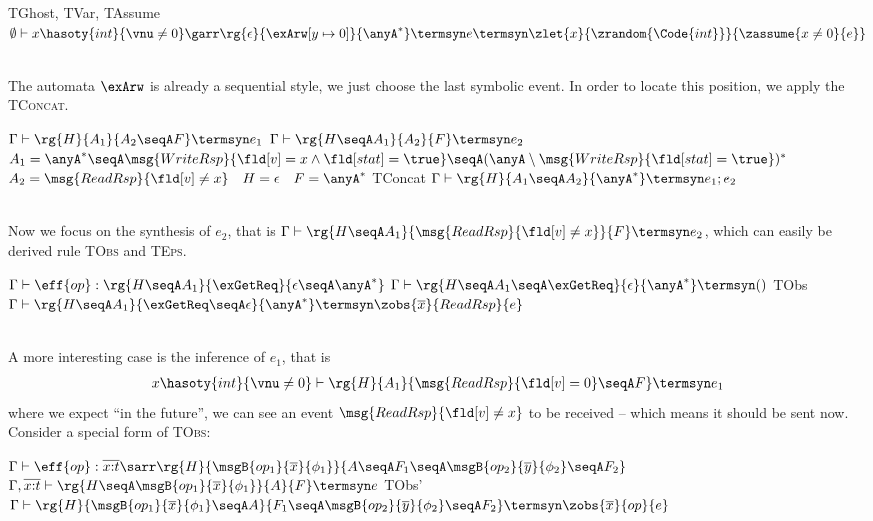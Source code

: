 {\footnotesize{}
{TGhost, TVar, TAssume}
{$\emptyset \vdash x\hasoty{int}{\vnu \not= 0}\garr \rg{\epsilon}{\exArw[y \mapsto 0]}{\anyA^*} \termsyn e \termsyn \zlet{x}{\zrandom{\Code{int}}}{\zassume{x \not= 0}{e}}$}}
\\ \ 

The automata $\exArw$ is already a sequential style, we just choose the last symbolic event. In order to locate this position, we apply the \textsc{TConcat}.

{\footnotesize\mprooftr{100mm}
{$\Gamma \vdash \rg{H}{A_1}{A_2 \seqA F} \termsyn e_1$ \quad
 $\Gamma \vdash \rg{H\seqA A_1}{A_2}{F} \termsyn e_2$ \quad
 $A_1 = \anyA^* \seqA \msg{WriteRsp}{\fld[v] = x \land \fld[stat] = \true} \seqA (\anyA \setminus \msg{WriteRsp}{\fld[stat] = \true})^*$\quad
 $A_2 = \msg{ReadRsp}{\fld[v] \not= x} \quad H = \epsilon \quad  F = \anyA^*$
 }
{TConcat}
{$\Gamma \vdash \rg{H}{A_1 \seqA A_2}{\anyA^*} \termsyn e_1;e_2$}}
\\ \ 

Now we focus on the synthesis of $e_2$, that is $\Gamma \vdash \rg{H\seqA A_1}{\msg{ReadRsp}{\fld[v] \not= x}}{F} \termsyn e_2$, which can easily be derived rule \textsc{TObs} and \textsc{TEps}.

{\footnotesize\mprooftr{105mm}
{
$\Gamma \vdash \eff{op} : \rg{ H\seqA A_1 }{\exGetReq}{\epsilon \seqA \anyA^*}$ 
\quad
 $\Gamma \vdash \rg{H\seqA A_1 \seqA \exGetReq}{\epsilon}{\anyA^*} \termsyn ()$}
{TObs}
{$\Gamma \vdash \rg{H\seqA A_1}{\exGetReq \seqA \epsilon}{\anyA^*} \termsyn \zobs{\overline{x}}{ReadRsp}{e}$}}
\\ \ 

A more interesting case is the inference of $e_1$, that is 
\begin{align*}
   x\hasoty{int}{\vnu \not= 0} \vdash \rg{H}{A_1}{\msg{ReadRsp}{\fld[v] = 0} \seqA F} \termsyn e_1
\end{align*}\noindent
where we expect ``in the future'', we can see an event $\msg{ReadRsp}{\fld[v] \not= x}$ to be received -- which means it should be sent now. Consider a special form of \textsc{TObs}:

{\footnotesize\mprooftr{105mm}
{
$\Gamma \vdash \eff{op} : \overline{x{:}t}\sarr \rg{H}{\msgB{op_1}{\overline{x}}{\phi_1}}{A \seqA F_1 \seqA \msgB{op_2}{\overline{y}}{\phi_2} \seqA F_2}$ 
\quad
 $\Gamma, \overline{x{:}t} \vdash \rg{H \seqA \msgB{op_1}{\overline{x}}{\phi_1}}{A}{F} \termsyn e$}
{TObs'}
{$\Gamma \vdash \rg{H}{\msgB{op_1}{\overline{x}}{\phi_1} \seqA A}{F_1 \seqA \msgB{op_2}{\overline{y}}{\phi_2} \seqA F_2} \termsyn \zobs{\overline{x}}{op}{e}$}}
\\ \ 

